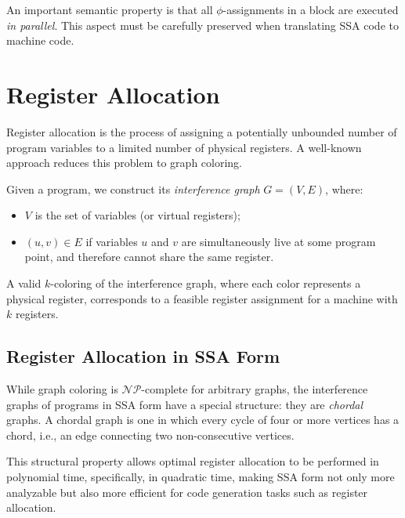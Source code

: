An important semantic property is that all $\phi$-assignments in a block are executed \textit{in parallel}. This aspect must be carefully preserved when translating SSA code to machine code.

\section{Register Allocation}
\label{sec:ra}

Register allocation is the process of assigning a potentially unbounded number of program variables to a limited number of physical registers. A well-known approach reduces this problem to graph coloring.

Given a program, we construct its \textit{interference graph} $G = (V, E)$, where:

\begin{itemize}
    \item $V$ is the set of variables (or virtual registers);
    \item $(u, v) \in E$ if variables $u$ and $v$ are simultaneously live at some program point, and therefore cannot share the same register.
\end{itemize}

A valid $k$-coloring of the interference graph, where each color represents a physical register, corresponds to a feasible register assignment for a machine with $k$ registers.

\subsection{Register Allocation in SSA Form}

While graph coloring is $\mathcal{NP}$-complete for arbitrary graphs, the interference graphs of programs in SSA form have a special structure: they are \textit{chordal} graphs. A chordal graph is one in which every cycle of four or more vertices has a chord, i.e., an edge connecting two non-consecutive vertices.

This structural property allows optimal register allocation to be performed in polynomial time, specifically, in quadratic time, making SSA form not only more analyzable but also more efficient for code generation tasks such as register allocation.

